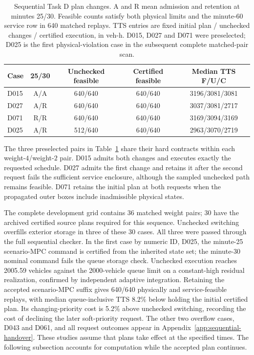 \documentclass[journal,10pt]{IEEEtran}
\newcommand{\appref}[1]{Appendix~\ref{#1}}
\begin{document}
\begin{table}[t]
\centering\small
\caption{Sequential Task D plan changes. A and R mean admission and
retention at minutes 25/30. Feasible counts satisfy both physical limits
and the minute-60 service row in 640 matched replays. TTS entries are
fixed initial plan / unchecked changes / certified execution, in veh-h.
D015, D027 and D071 were preselected; D025 is the first physical-violation
case in the subsequent complete matched-pair scan.}
\label{tab:sequential-handover}
\setlength{\tabcolsep}{4pt}
\begin{tabular}{@{}lcccc@{}}
\toprule
Case & 25/30 & Unchecked feasible & Certified feasible & Median TTS F/U/C\\
\midrule
D015 & A/A & 640/640 & 640/640 & 3196/3081/3081\\
D027 & A/R & 640/640 & 640/640 & 3037/3081/2717\\
D071 & R/R & 640/640 & 640/640 & 3169/3094/3169\\
D025 & A/R & 512/640 & 640/640 & 2963/3070/2719\\
\bottomrule
\end{tabular}
\end{table}

The three preselected pairs in Table~\ref{tab:sequential-handover} share
their hard contracts within each weight-$4$/weight-$2$ pair. D015 admits
both changes and executes exactly the requested schedule. D027 admits the
first change and retains it after the second request fails the sufficient
service enclosure, although the sampled unchecked path remains feasible.
D071 retains the initial plan at both requests when the propagated outer
boxes include inadmissible physical states.

The complete development grid contains 36 matched weight pairs; 30 have
the archived certified source plans required for this sequence. Unchecked
switching overfills exterior storage in three of these 30 cases. All three
were passed through the full sequential checker. In the first case by
numeric ID, D025, the minute-25 scenario-MPC command is certified from
the inherited state set; the minute-30 nominal command fails the queue
storage check. Unchecked execution reaches 2005.59 vehicles against the
2000-vehicle queue limit on a constant-high residual realization,
confirmed by independent adaptive integration. Retaining the accepted
scenario-MPC suffix gives 640/640 physically and service-feasible replays,
with median queue-inclusive TTS 8.2\% below holding the initial certified
plan. Its changing-priority cost is 5.2\% above unchecked switching,
recording the cost of declining the later soft-priority request. The other
two overflow cases, D043 and D061, and all request outcomes appear in
\appref{app:sequential-handover}. These studies assume that plans take effect at the specified times.
The following subsection accounts for computation while the accepted
plan continues.
\end{document}
